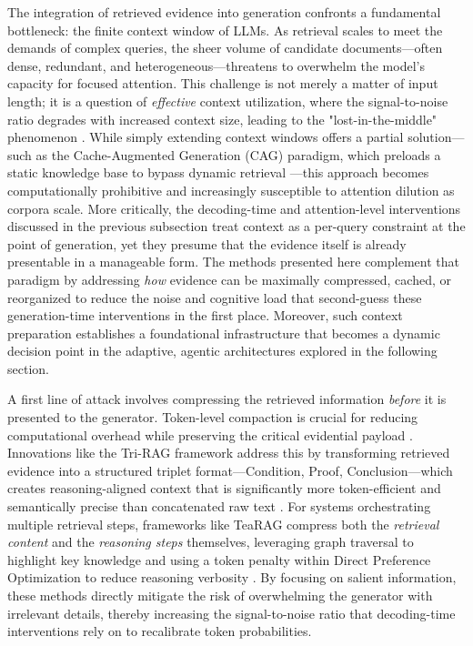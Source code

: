 \documentclass[11pt,a4paper]{article}
\begin{document}
The integration of retrieved evidence into generation confronts a fundamental bottleneck: the finite context window of LLMs. As retrieval scales to meet the demands of complex queries, the sheer volume of candidate documents---often dense, redundant, and heterogeneous---threatens to overwhelm the model's capacity for focused attention. This challenge is not merely a matter of input length; it is a question of \emph{effective} context utilization, where the signal-to-noise ratio degrades with increased context size, leading to the "lost-in-the-middle" phenomenon \cite{arxiv:2410.12837v1}. While simply extending context windows offers a partial solution---such as the Cache-Augmented Generation (CAG) paradigm, which preloads a static knowledge base to bypass dynamic retrieval \cite{arxiv:2412.15605v2}---this approach becomes computationally prohibitive and increasingly susceptible to attention dilution as corpora scale. More critically, the decoding-time and attention-level interventions discussed in the previous subsection treat context as a per-query constraint at the point of generation, yet they presume that the evidence itself is already presentable in a manageable form. The methods presented here complement that paradigm by addressing \emph{how} evidence can be maximally compressed, cached, or reorganized to reduce the noise and cognitive load that second-guess these generation-time interventions in the first place. Moreover, such context preparation establishes a foundational infrastructure that becomes a dynamic decision point in the adaptive, agentic architectures explored in the following section.

A first line of attack involves compressing the retrieved information \emph{before} it is presented to the generator. Token-level compaction is crucial for reducing computational overhead while preserving the critical evidential payload \cite{arxiv:2404.10981v1}. Innovations like the Tri-RAG framework address this by transforming retrieved evidence into a structured triplet format---Condition, Proof, Conclusion---which creates reasoning-aligned context that is significantly more token-efficient and semantically precise than concatenated raw text \cite{arxiv:2604.12610v1}. For systems orchestrating multiple retrieval steps, frameworks like TeaRAG compress both the \emph{retrieval content} and the \emph{reasoning steps} themselves, leveraging graph traversal to highlight key knowledge and using a token penalty within Direct Preference Optimization to reduce reasoning verbosity \cite{arxiv:2511.05385v2}. By focusing on salient information, these methods directly mitigate the risk of overwhelming the generator with irrelevant details, thereby increasing the signal-to-noise ratio that decoding-time interventions rely on to recalibrate token probabilities.
\end{document}
